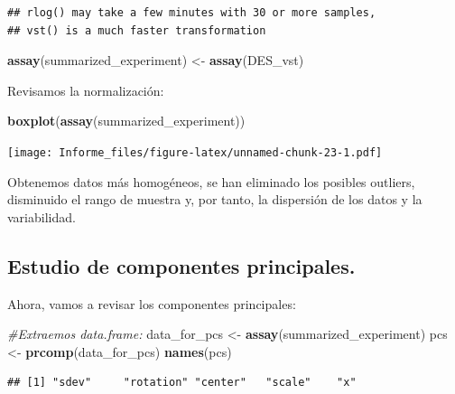 \documentclass[
]{article}
\newenvironment{Shaded}{\begin{snugshade}}{\end{snugshade}}
\newcommand{\CommentTok}[1]{\textcolor[rgb]{0.56,0.35,0.01}{\textit{#1}}}
\newcommand{\FunctionTok}[1]{\textcolor[rgb]{0.13,0.29,0.53}{\textbf{#1}}}
\newcommand{\NormalTok}[1]{#1}
\newcommand{\OtherTok}[1]{\textcolor[rgb]{0.56,0.35,0.01}{#1}}
\newcommand{\SpecialCharTok}[1]{\textcolor[rgb]{0.81,0.36,0.00}{\textbf{#1}}}
\begin{document}
\begin{verbatim}
## rlog() may take a few minutes with 30 or more samples,
## vst() is a much faster transformation
\end{verbatim}

\begin{Shaded}
\begin{Highlighting}[]
\FunctionTok{assay}\NormalTok{(summarized\_experiment) }\OtherTok{\textless{}{-}} \FunctionTok{assay}\NormalTok{(DES\_vst)}
\end{Highlighting}
\end{Shaded}

Revisamos la normalización:

\begin{Shaded}
\begin{Highlighting}[]
\FunctionTok{boxplot}\NormalTok{(}\FunctionTok{assay}\NormalTok{(summarized\_experiment))}
\end{Highlighting}
\end{Shaded}

\texttt{[image: Informe\_files/figure-latex/unnamed-chunk-23-1.pdf]}

Obtenemos datos más homogéneos, se han eliminado los posibles outliers,
disminuido el rango de muestra y, por tanto, la dispersión de los datos
y la variabilidad.

\subsection{Estudio de componentes
principales.}\label{estudio-de-componentes-principales.}

Ahora, vamos a revisar los componentes principales:

\begin{Shaded}
\begin{Highlighting}[]
\CommentTok{\#Extraemos data.frame:}
\NormalTok{data\_for\_pcs }\OtherTok{\textless{}{-}} \FunctionTok{assay}\NormalTok{(summarized\_experiment)}
\NormalTok{pcs }\OtherTok{\textless{}{-}} \FunctionTok{prcomp}\NormalTok{(data\_for\_pcs)}
\FunctionTok{names}\NormalTok{(pcs)}
\end{Highlighting}
\end{Shaded}

\begin{verbatim}
## [1] "sdev"     "rotation" "center"   "scale"    "x"
\end{verbatim}

\begin{Shaded}
\end{Shaded}
\end{document}
